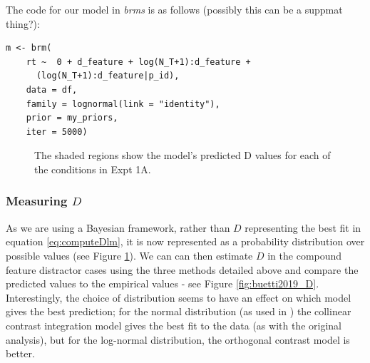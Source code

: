 \documentclass[smallextended]{svjour3}       %
\begin{document}
The code for our model in \textit{brms} is as follows (possibly this can be a suppmat thing?):

\begin{verbatim}
m <- brm(
    rt ~  0 + d_feature + log(N_T+1):d_feature + 
      (log(N_T+1):d_feature|p_id),
    data = df,
    family = lognormal(link = "identity"),
    prior = my_priors,
    iter = 5000)
\end{verbatim}


\begin{figure}
\centering
{}
\caption{The shaded regions show the model's predicted D values for each of the conditions in Expt 1A.}
\label{fig:buetti2019_a1}
\end{figure}

\subsubsection{Measuring $D$}

As we are using a Bayesian framework, rather than $D$ representing the best fit in equation \ref{eq:computeDlm}, it is now represented as a probability distribution over possible values (see Figure \ref{fig:buetti2019_a1}). We can can then estimate $D$ in the compound feature distractor cases using the three methods detailed above and compare the predicted values to the empirical values - see Figure \ref{fig:buetti2019_D}. Interestingly, the choice of distribution seems to have an effect on which model gives the best prediction; for the normal distribution (as used in \cite{buetti2019predicting}) the collinear contrast integration model gives the best fit to the data (as with the original analysis), but for the log-normal distribution, the orthogonal contrast model is better.
\end{document}
